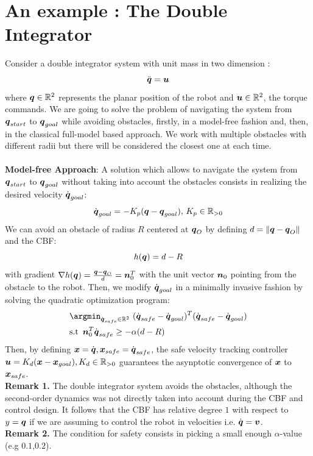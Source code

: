 \section{An example : The Double Integrator}
Consider a double integrator system with unit mass in two dimension : 
\begin{equation}
    \ddot{{\boldsymbol{q}}} = \boldsymbol{u}
\end{equation}
where ${\boldsymbol{q}} \in \mathbb{R}^2$ represents the planar position of the robot and $\boldsymbol{u} \in \mathbb{R}^2$, the torque commands.
We are going to solve the problem of navigating the system from ${\boldsymbol{q}}_{start}$ to ${\boldsymbol{q}}_{goal}$ while avoiding obstacles, firstly,  in a model-free fashion and, then, in the classical full-model based approach.
We work with multiple obstacles with  different radii but  there will be considered  the closest one at each time.\\ \\
\textbf{Model-free Approach}:
A solution which allows to navigate the system from ${\boldsymbol{q}}_{start}$ to ${\boldsymbol{q}}_{goal}$ without taking into account the obstacles consists in realizing the desired velocity $\dot{{\boldsymbol{q}}}_{goal}$:   
\begin{equation}
    \dot{{\boldsymbol{q}}}_{goal}=-K_p({\boldsymbol{q}} - {\boldsymbol{q}}_{goal}),\,K_p\in\mathbb{R}_{>0}
\end{equation}
 We can avoid an obstacle of radius $R$ centered at ${\boldsymbol{q}}_O$ by defining $d = \lVert {\boldsymbol{q}}-{\boldsymbol{q}}_O \rVert$ and the CBF:
\begin{equation}
h({\boldsymbol{q}})=d-R
\end{equation}
with gradient $\nabla h({\boldsymbol{q}}) = \frac{{\boldsymbol{q}}-{\boldsymbol{q}}_O}{d} = \boldsymbol{n}_0^T$ with the unit vector $\boldsymbol{n}_0$ pointing from the obstacle to the robot. Then, we modify $\dot{{\boldsymbol{q}}}_{goal}$ in a minimally invasive fashion by solving the quadratic optimization program:
\begin{align}
    &\argmin_{\dot{\qv}_{safe} \in \mathbb{R}^2} \,\,(\dot{\qv}_{safe}-\dot{\qv}_{goal})^T(\dot{\qv}_{safe}-\dot{\qv}_{goal}) \notag\\
    &\mathrm{s.t} \,\,\, \nv_0^T \dot{\qv}_{safe}\geq -\alpha(d-R)
\end{align}
Then, by defining $\boldsymbol{x} = \dot{{\boldsymbol{q}}}, \boldsymbol{x}_{safe}=\dot{{\boldsymbol{q}}}_{safe}$, the safe velocity tracking controller $\boldsymbol{u} = K_d (\boldsymbol{x} - \boldsymbol{x}_{goal}), K_d \in \mathbb{R}_{>0} $ guarantees the asynptotic convergence of $\boldsymbol{x}$ to $\boldsymbol{x}_{safe}$. \\
\textbf{Remark 1.} The double integrator system avoids the obstacles, although the second-order dynamics was not directly taken into account during the CBF and control design. It follows that the CBF has relative degree $1$ with respect to $y = {\boldsymbol{q}}$ if we are assuming to control the robot in velocities i.e. $\dot{{\boldsymbol{q}}}=\boldsymbol{v}$. \\
\textbf{Remark 2.} The condition for safety consists in picking a small enough $\alpha$-value (e.g $0.1$,$0.2$).

